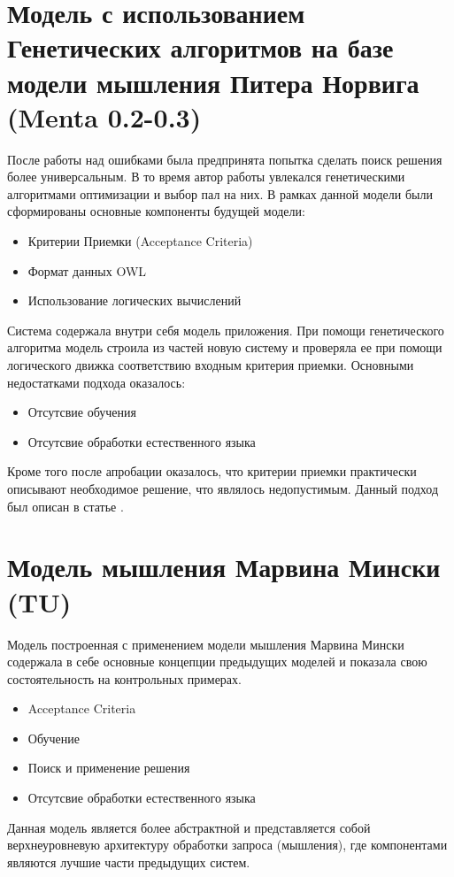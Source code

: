 \section{Модель с использованием Генетических алгоритмов на базе модели мышления Питера Норвига (Menta 0.2-0.3)}
После работы над ошибками была предпринята попытка сделать поиск решения более универсальным. В то время автор работы увлекался генетическими алгоритмами оптимизации и выбор пал на них. В рамках данной модели были сформированы основные компоненты будущей модели:
\begin{itemize}
	\item Критерии Приемки (Acceptance Criteria)
	\item Формат данных OWL 
	\item Использование логических вычислений
\end{itemize}
Система содержала внутри себя модель приложения. При помощи генетического алгоритма модель строила из частей новую систему и проверяла ее при помощи логического движка \cite{NARS} соответствию входным критерия приемки. Основными недостатками подхода оказалось:
\begin{itemize}
	\item Отсутсвие обучения
	\item Отсутсвие обработки естественного языка
\end{itemize}
Кроме того после апробации оказалось, что критерии приемки практически описывают необходимое решение, что являлось недопустимым. Данный подход был описан в статье \cite{SECR}.
\section{Модель мышления Марвина Мински (TU)}
Модель построенная с применением модели мышления Марвина Мински содержала в себе основные концепции предыдущих моделей и показала свою состоятельность на контрольных примерах.
\begin{itemize}
	\item Acceptance Criteria
	\item Обучение
	\item Поиск и применение решения 
	\item Отсутсвие обработки естественного языка
\end{itemize}
Данная модель является более абстрактной и представляется собой верхнеуровневую архитектуру обработки запроса (мышления), где компонентами являются лучшие части предыдущих систем.
